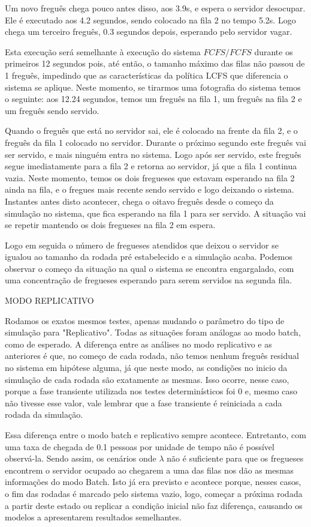 \documentclass[a4paper,10pt]{article}
\begin{document}
    Um novo freguês chega pouco antes disso, aos 3.9s, e espera o servidor desocupar. Ele é executado aos 4.2 segundos, sendo colocado na fila 2 no tempo 5.2s. Logo chega um terceiro freguês, 0.3 segundos depois, esperando pelo servidor vagar.

    Esta execução será semelhante à execução do sistema $FCFS/FCFS$ durante os primeiros 12 segundos pois, até então, o tamanho máximo das filas não passou de 1 freguês, impedindo que as características da política LCFS que diferencia o sistema se aplique. Neste momento, se tirarmos uma fotografia do sistema temos o seguinte: aos 12.24 segundos, temos um freguês na fila 1, um freguês na fila 2 e um freguês sendo servido.

    Quando o freguês que está no servidor sai, ele é colocado na frente da fila 2, e o freguês da fila 1 colocado no servidor. Durante o próximo segundo este freguês vai ser servido, e mais ninguém entra no sistema. Logo após ser servido, este freguês segue imediatamente para a fila 2 e retorna ao servidor, já que a fila 1 continua vazia. Neste momento, temos os dois fregueses que estavam esperando na fila 2 ainda na fila, e o fregues mais recente sendo servido e logo deixando o sistema. Instantes antes disto acontecer, chega o oitavo freguês desde o começo da simulação no sistema, que fica esperando na fila 1 para ser servido. A situação vai se repetir mantendo os dois fregueses na fila 2 em espera.

    Logo em seguida o número de fregueses atendidos que deixou o servidor se igualou ao tamanho da rodada pré estabelecido e a simulação acaba. Podemos observar o começo da situação na qual o sistema se encontra engargalado, com uma concentração de fregueses esperando para serem servidos na segunda fila.


MODO REPLICATIVO


    Rodamos os exatos mesmos testes, apenas mudando o parâmetro do tipo de simulação para "Replicativo". Todas as situações foram análogas ao modo batch, como de esperado. A diferença entre as análises no modo replicativo e as anteriores é que, no começo de cada rodada, não temos nenhum freguês residual no sistema em hipótese alguma, já que neste modo, as condições no inicio da simulação de cada rodada são exatamente as mesmas. Isso ocorre, nesse caso, porque a fase transiente utilizada nos testes determinísticos foi 0 e, mesmo caso não tivesse esse valor, vale lembrar que a fase transiente é reiniciada a cada rodada da simulação.

    Essa diferença entre o modo batch e replicativo sempre acontece. Entretanto, com uma taxa de chegada de 0.1 pessoas por unidade de tempo não é possível observá-la. Sendo assim, os cenários onde $\lambda$ não é suficiente para que os fregueses encontrem o servidor ocupado ao chegarem a uma das filas nos dão as mesmas informações do modo Batch. Isto já era previsto e acontece porque, nesses casos, o fim das rodadas é marcado pelo sistema vazio, logo, começar a próxima rodada a partir deste estado ou replicar a condição inicial não faz diferença, causando os modelos a apresentarem resultados semelhantes.
\end{document}
